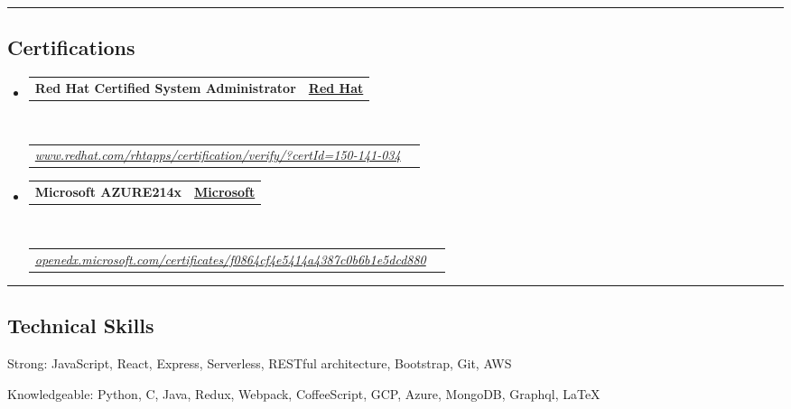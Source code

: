 \documentclass[10pt,a4paper,hidelinks]{article}
\makeatletter
\newenvironment{indentsection}[1]%
{\begin{list}{}%
	{\setlength{\leftmargin}{#1}}%
	\item[]%
}
{\end{list}}
\newcommand{\headerrow}[2]
{\begin{tabular*}{\linewidth}{l@{\extracolsep{\fill}}r}
	#1 &
	#2 \\
\end{tabular*}}
\makeatother
\begin{document}
\hrule
\vspace{-0.4em}
\subsection*{Certifications}

\begin{itemize}
	\parskip=0.1em

	\item 
	\headerrow
		{\textbf{Red Hat Certified System Administrator}}
		{{\href{https://www.redhat.com/}{\textbf{Red Hat}}}}
	\\
	\headerrow
	    {\emph{\href{https://www.redhat.com/rhtapps/certification/verify/?certId=150-141-034}{www.redhat.com/rhtapps/certification/verify/?certId=150-141-034}}}
		{\emph{}}
	
	\item 
	\headerrow
		{\textbf{Microsoft AZURE214x}}
		{{\href{https://www.microsoft.com/}{\textbf{Microsoft}}}}
	\\
	\headerrow
	    {\emph{\href{https://openedx.microsoft.com/certificates/f0864cf4e5414a4387c0b6b1e5dcd880}{openedx.microsoft.com/certificates/f0864cf4e5414a4387c0b6b1e5dcd880}}}
		{\emph{}}

\end{itemize}


\hrule
\vspace{-0.4em}
\subsection*{Technical Skills}

\begin{indentsection}{\parindent}
\begin{description*}
	\item[Strong:]
	JavaScript, React, Express, Serverless, RESTful architecture, Bootstrap, Git, AWS
	\item[Knowledgeable:]
	Python, C, Java, Redux, Webpack, CoffeeScript, GCP, Azure, MongoDB, Graphql, \LaTeX{}
\end{description*}
\end{indentsection}
\end{document}
